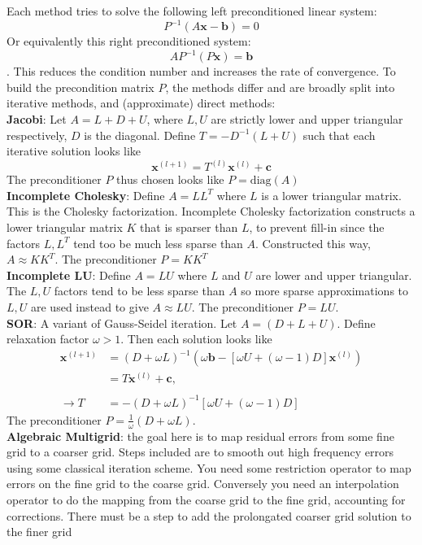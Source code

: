 \documentclass[letterpaper]{article}
\begin{document}
\begin{enumerate}
    Each method tries to solve the following left preconditioned linear system: $$P^{-1}(A\mathbf{x} - \mathbf{b}) = 0$$
    Or equivalently this right preconditioned system: $$AP^{-1}(P\mathbf{x}) = \mathbf{b}$$. This reduces the condition number and increases the rate of convergence. To build the precondition matrix $P$, the methods differ and are broadly split into iterative methods, and (approximate) direct methods: \\
    \textbf{Jacobi}: Let $A = L+D+U$, where $L, U$ are strictly lower and upper triangular respectively, $D$ is the diagonal. Define $T=-D^{-1}(L+U)$ such that each iterative solution looks like $$\mathbf{x}^{(l+1)} = T^{(l)}\mathbf{x}^{(l)} + \mathbf{c}$$The preconditioner $P$ thus chosen looks like $P=\mathrm{diag}(A)$ \\
    \textbf{Incomplete Cholesky}: Define $A = LL^T$ where $L$ is a lower triangular matrix. This is the Cholesky factorization. Incomplete Cholesky factorization constructs a lower triangular matrix $K$ that is sparser than $L$, to prevent fill-in since the factors $L, L^T$ tend too be much less sparse than $A$. Constructed this way, $A \approx KK^T$. The preconditioner $P=KK^T$ \\
    \textbf{Incomplete LU}: Define $A=LU$ where $L$ and $U$ are lower and upper triangular. The $L, U$ factors tend to be less sparse than $A$ so more sparse approximations to $L, U$ are used instead to give $A \approx LU$. The preconditioner $P=LU$. \\
    \textbf{SOR}: A variant of Gauss-Seidel iteration. Let $A=(D+L+U)$. Define relaxation factor $\omega > 1$. Then each solution looks like 
    $$\begin{aligned}
        \mathbf{x}^{(l+1)} &= (D + \omega L)^{-1} \left(\omega \mathbf{b} - [\omega U + (\omega - 1)D]\mathbf{x}^{(l)}\right) \\
        &= T\mathbf{x}^{(l)} + \mathbf{c}, \\
        \\
        \rightarrow T &= -(D + \omega L)^{-1}[\omega U + (\omega - 1)D]
    \end{aligned}$$
    The preconditioner $P=\frac{1}{\omega}(D + \omega L)$. \\
    \textbf{Algebraic Multigrid}: the goal here is to map residual errors from some fine grid to a coarser grid. Steps included are to smooth out high frequency errors using some classical iteration scheme. You need some restriction operator to map errors on the fine grid to the coarse grid. Conversely you need an interpolation operator to do the mapping from the coarse grid to the fine grid, accounting for corrections. There must be a step to add the prolongated coarser grid solution to the finer grid
\end{enumerate}
\end{document}
